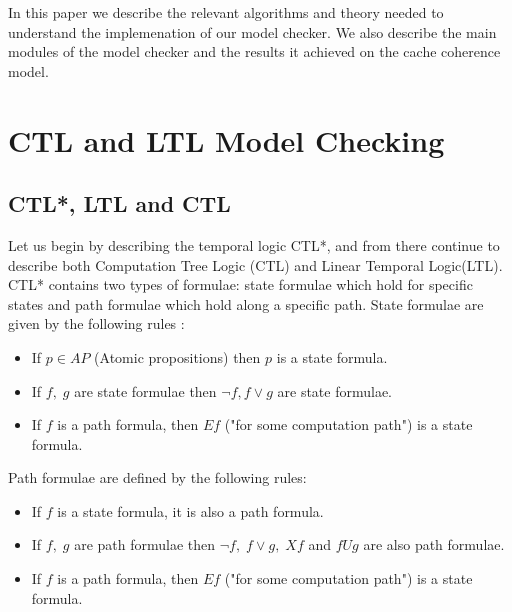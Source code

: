 \documentclass[11pt]{article}
\begin{document}
   In this paper we describe the relevant algorithms and theory needed to
   understand the implemenation of our model checker. We also describe the 
   main modules of the model checker and the results it achieved on the 
   cache coherence model.

\section{CTL and LTL Model Checking}

   \subsection{CTL*, LTL and CTL}
        Let us begin by describing the temporal logic CTL*, and from there continue
        to describe both Computation Tree Logic (CTL) and Linear Temporal Logic(LTL).
        CTL* contains two types of formulae: state formulae which hold for specific
        states and path formulae which hold along a specific path. State formulae
        are given by the following rules \cite{ltl}:
        \begin{itemize}
            \item
                If $p \in AP$ (Atomic propositions) then $p$ is a state formula.

            \item
                If $f,\; g$ are state formulae then $\neg f, f \vee g$ are state formulae.

            \item
                If $f$ is a path formula, then $Ef$ ("for some computation path")
                is a state formula.
        \end{itemize}

        Path formulae are defined by the following rules:
        \begin{itemize}
            \item
                If $f$ is a state formula, it is also a path formula.

            \item
                If $f,\; g$ are path formulae then $\neg f,\; f \vee g, \; Xf$ and 
                $fUg$ are also path formulae.

            \item
                If $f$ is a path formula, then $Ef$ ("for some computation path")
                is a state formula.
        \end{itemize}
        
\end{document}
